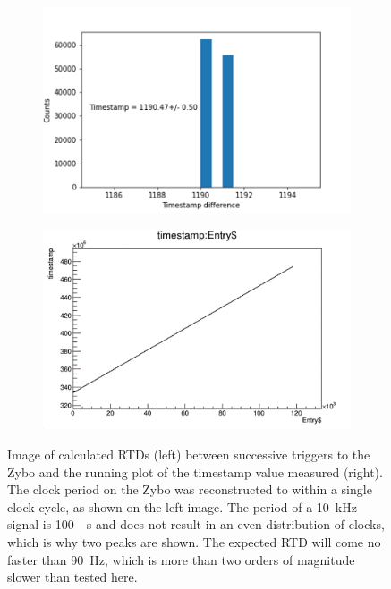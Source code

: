 \begin{figure}[]
\centering
\begin{subfigure}{.5\textwidth}
  \centering
  \includegraphics[width=\textwidth]{images/zybo_10khz_timestamp_frequency_calibration.png}
  \caption{}
\end{subfigure}%
\begin{subfigure}{.5\textwidth}
  \centering
  \includegraphics[width=\textwidth]{images/zybo_10khz_timestamp_graph.png}
  \caption{}
\end{subfigure}
\caption{Image of calculated RTDs (left) between successive triggers to the Zybo and the running plot of the timestamp value measured (right).
The clock period on the Zybo was reconstructed to within a single clock cycle, as shown on the left image.
The period of a 10~\unit{kHz} signal is 100~\unit{\mu s} and does not result in an even distribution of clocks, which is why two peaks are shown.
The expected RTD will come no faster than 90~\unit{Hz}, which is more than two orders of magnitude slower than tested here.
}
\label{fig:frequency_reconstructio}
\end{figure}

